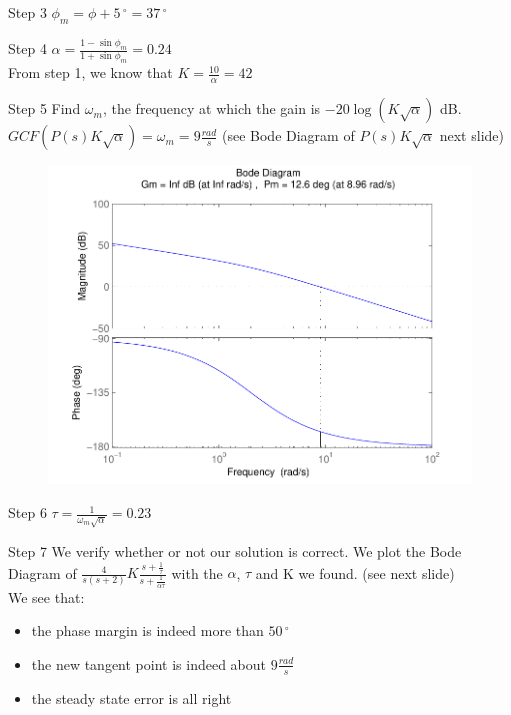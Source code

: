 \begin{frame}
\begin{exampleblock}{Step 3}
	$\phi_m = \phi + 5\,^{\circ} = 37\,^{\circ}$
\end{exampleblock}
	\begin{exampleblock}{Step 4}
		$\alpha = \frac{1 - \sin \phi_m}{1 + \sin \phi_m} = 0.24$ \\
		From step 1, we know that $K = \frac{10}{\alpha} = 42$
	\end{exampleblock}
	\begin{exampleblock}{Step 5}
		Find $\omega_m$, the frequency at which the gain is $-20\log\left( K\sqrt{\alpha}\right) $ dB. 
		$GCF\left( P(s)K\sqrt{\alpha}\right) = \omega_m = 9 \frac{rad}{s}$ (see Bode Diagram of  $P(s)K\sqrt{\alpha}$ next slide)
	\end{exampleblock}
\end{frame}

\begin{frame}
	\begin{figure}
		\centering
		\includegraphics[width=0.7
		\linewidth]{exampleleadsteptangent}
	\end{figure}
\end{frame}

\begin{frame}
	\begin{exampleblock}{Step 6}
		$\tau = \frac{1}{\omega_m\sqrt{\alpha}} = 0.23$
	\end{exampleblock}
	\begin{exampleblock}{Step 7}
	We verify whether or not our solution is correct. We plot the Bode Diagram of $ \frac{4}{s(s+2)} K \frac{s+\frac{1}{\tau}}{s+\frac{1}{\alpha\tau}}$ with the $\alpha$, $\tau$ and K we found. (see next slide) \\
	We see that: 
	\begin{itemize}
		\item the phase margin is indeed more than $50\,^{\circ}$ 
		\item the new tangent point is indeed about $9\frac{rad}{s}$
		\item the steady state error is all right
	\end{itemize} 
	\end{exampleblock}
\end{frame}

